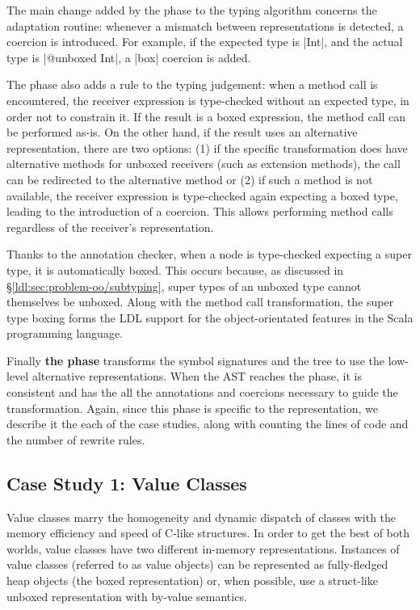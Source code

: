 The main change added by the \coerce{} phase to the typing algorithm concerns the adaptation routine: whenever a mismatch between representations is detected, a coercion is introduced. For example, if the expected type is |Int|, and the actual type is |@unboxed Int|, a |box| coercion is added.

The \coerce{} phase also adds a rule to the typing judgement: when a method call is encountered, the receiver expression is type-checked without an expected type, in order not to constrain it. If the result is a boxed expression, the method call can be performed as-is. On the other hand, if the result uses an alternative representation, there are two options: (1) if the specific transformation does have alternative methods for unboxed receivers (such as extension methods), the call can be redirected to the alternative method or (2) if such a method is not available, the receiver expression is type-checked again expecting a boxed type, leading to the introduction of a coercion. This allows performing method calls regardless of the receiver's representation.

Thanks to the annotation checker, when a node is type-checked expecting a super type, it is automatically boxed. This occurs because, as discussed in \S\ref{ldl:sec:problem-oo/subtyping}, super types of an unboxed type cannot themselves be unboxed. Along with the method call transformation, the super type boxing forms the LDL support for the object-orientated features in the Scala programming language.

Finally \textbf{the \commit{} phase} transforms the symbol signatures and the tree to use the low-level alternative representations. When the AST reaches the \commit{} phase, it is consistent and has the all the annotations and coercions necessary to guide the transformation. Again, since this phase is specific to the representation, we describe it the each of the case studies, along with counting the lines of code and the number of rewrite rules.

\subsection{Case Study 1: Value Classes}
\label{ldl:sec:validation/value-classes}

Value classes \cite{gosling-value-classes, dot-net-value-types-www, sip-value-classes} marry the homogeneity and dynamic dispatch of classes with the memory efficiency and speed of C-like structures. In order to get the best of both worlds, value classes have two different in-memory representations. Instances of value classes (referred to as value objects) can be represented as fully-fledged heap objects (the boxed representation) or, when possible, use a struct-like unboxed representation with by-value semantics.

